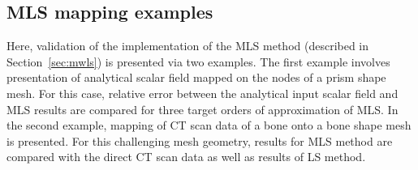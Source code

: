 \documentclass[11pt]{acmeArticle}
\numberwithin{equation}{section}
\begin{document}
\subsection{MLS mapping examples}
\label{sec:mals_mapping}
Here, validation of the implementation of the MLS method (described in Section~\ref{sec:mwls}) is presented via two examples.
The first example involves presentation of analytical scalar field mapped on the nodes of a prism shape mesh.
For this case, relative error between the analytical input scalar field and MLS results are compared for three target orders of approximation of MLS.
In the second example, mapping of CT scan data of a bone onto a bone shape mesh is presented.
For this challenging mesh geometry, results for MLS method are compared with the direct CT scan data as well as results of LS method.
    
\end{document}
